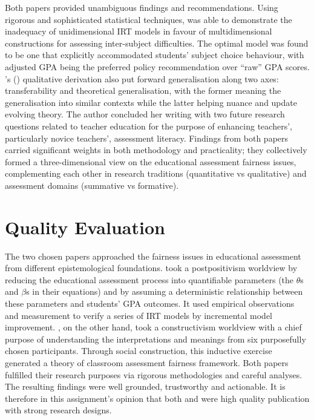 \documentclass[
    a4paper,            %
    12pt,               %
    stu,                %
    noextraspace,       %
    floatsintext,       %
    biblatex,           %
    colorlinks=true,        %
    linkcolor=red,          %
    anchorcolor=black,      %
    citecolor=blue,         %
    urlcolor=blue,          %
    bookmarks=true,         %
    bookmarksopen=false,    %
    bookmarksnumbered=true  %
    margin=2cm              %
]{apa7}
\newcommand{\poscite}[1]{\citeauthor{#1}'s (\citeyear{#1})}
\begin{document}
Both papers provided unambiguous findings and recommendations. Using rigorous and sophisticated statistical techniques, \textcite{korobko:2008} was able to demonstrate the inadequacy of unidimensional IRT models in favour of multidimensional constructions for assessing inter-subject difficulties. The optimal model was found to be one that explicitly accommodated students' subject choice behaviour, with adjusted GPA being the preferred policy recommendation over ``raw'' GPA scores. \poscite{tierney:2014} qualitative derivation also put forward generalisation along two axes: transferability and theoretical generalisation, with the former meaning the generalisation into similar contexts while the latter helping nuance and update evolving theory. The author concluded her writing with two future research questions related to teacher education for the purpose of enhancing teachers', particularly novice teachers', assessment literacy. Findings from both papers carried significant weights in both methodology and practicality; they collectively formed a three-dimensional view on the educational assessment fairness issues, complementing each other in research traditions (quantitative vs qualitative) and assessment domains (summative vs formative).

\section{Quality Evaluation}

The two chosen papers approached the fairness issues in educational assessment from different epistemological foundations. \textcite{korobko:2008} took a postpositivism worldview by reducing the educational assessment process into quantifiable parameters (the $\theta$s and $\beta$s in their equations) and by assuming a deterministic relationship between these parameters and students' GPA outcomes. It used empirical observations and measurement to verify a series of IRT models by incremental model improvement. \textcite{tierney:2014}, on the other hand, took a constructivism worldview with a chief purpose of understanding the interpretations and meanings from six purposefully chosen participants. Through social construction, this inductive exercise generated a theory of classroom assessment fairness framework. Both papers fulfilled their research purposes via rigorous methodologies and careful analyses. The resulting findings were well grounded, trustworthy and actionable. It is therefore in this assignment's opinion that both \textcite{korobko:2008} and \textcite{tierney:2014} were high quality publication with strong research designs.

\printbibliography
\end{document}
